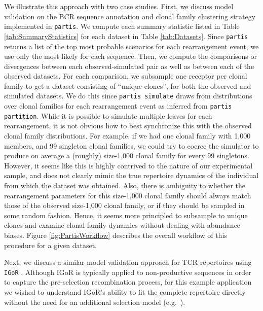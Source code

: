 \documentclass{article}
\begin{document}
We illustrate this approach with two case studies.
First, we discuss model validation on the BCR sequence annotation and clonal family clustering strategy implemented in \texttt{partis}\cite{Ralph2016-nw, Ralph2016-iz}.
We compute each summary statistic listed in Table \ref{tab:SummaryStatistics} for each dataset in Table \ref{tab:Datasets}.
Since \texttt{partis} returns a list of the top most probable scenarios for each rearrangement event, we use only the most likely for each sequence.
Then, we compute the comparisons or divergences between each observed-simulated pair as well as between each of the observed datasets.
For each comparison, we subsample one receptor per clonal family to get a dataset consisting of ``unique clones'', for both the observed and simulated datasets.
We do this since \texttt{partis simulate} draws from distributions over clonal families for each rearrangement event as inferred from \texttt{partis partition}.
While it is possible to simulate multiple leaves for each rearrangement, it is not obvious how to best synchronize this with the observed clonal family distributions.
For example, if we had one clonal family with 1,000 members, and 99 singleton clonal families, we could try to coerce the simulator to produce on average a (roughly) size-1,000 clonal family for every 99 singletons.
However, it seems like this is highly contrived to the nature of our experimental sample, and does not clearly mimic the true repertoire dynamics of the individual from which the dataset was obtained.
Also, there is ambiguity to whether the rearrangement parameters for this size-1,000 clonal family should always match those of the observed size-1,000 clonal family, or if they should be sampled in some random fashion.
Hence, it seems more principled to subsample to unique clones and examine clonal family dynamics without dealing with abundance biases.
Figure \ref{fig:PartisWorkflow} describes the overall workflow of this procedure for a given dataset.

Next, we discuss a similar model validation approach for TCR repertoires using \texttt{IGoR} \cite{Marcou2018-du}.
Although IGoR is typically applied to non-productive sequences in order to capture the pre-selection recombination process, for this example application we wished to understand IGoR's ability to fit the complete repertoire directly without the need for an additional selection model (e.g.\ \cite{Elhanati2014-mf}).
\end{document}
